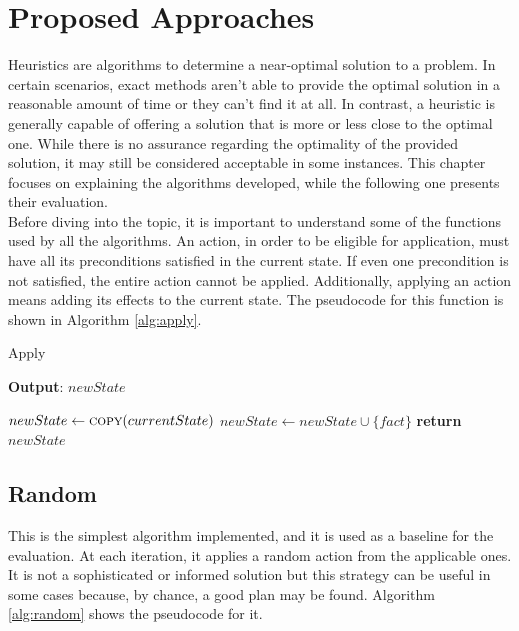 \chapter{Proposed Approaches}
\label{ch:heuristics}
Heuristics are algorithms to determine a near-optimal solution to a problem. In certain scenarios,
exact methods aren't able to provide the optimal solution in a reasonable amount of time or they can't find it
at all. In contrast, a heuristic is generally capable of offering a solution that is more or less close to
the optimal one.
While there is no assurance regarding the optimality of the provided solution, it may still be considered
acceptable in some instances.
This chapter focuses on explaining the algorithms developed, while the following one presents their evaluation.\\
Before diving into the topic, it is important to understand some of the functions used by all the algorithms.
An action, in order to be eligible for application, must have all its preconditions satisfied in the current state.
If even one precondition is not satisfied, the entire action cannot be applied.
Additionally, applying an action means adding its effects to the current state.
The pseudocode for this function is shown in Algorithm \ref{alg:apply}.

\begin{algorithm}
	\caption{Apply}
	\label{alg:apply}
	\hspace*{0.5em} \textbf{Output}: $newState$
	\begin{algorithmic}[1]
		\State $newState \gets \Call{copy}{currentState}$
		\State $newState \gets newState \cup \{fact\}$
		\EndIf
		\EndFor
		\State \textbf{return} $newState$
		\EndProcedure
	\end{algorithmic}
\end{algorithm}

\section{Random}
This is the simplest algorithm implemented, and it is used as a baseline for the evaluation.
At each iteration, it applies a random action from the applicable ones.
It is not a sophisticated or informed solution but this strategy can be useful
in some cases because, by chance, a good plan may be found.
Algorithm \ref{alg:random} shows the pseudocode for it.

